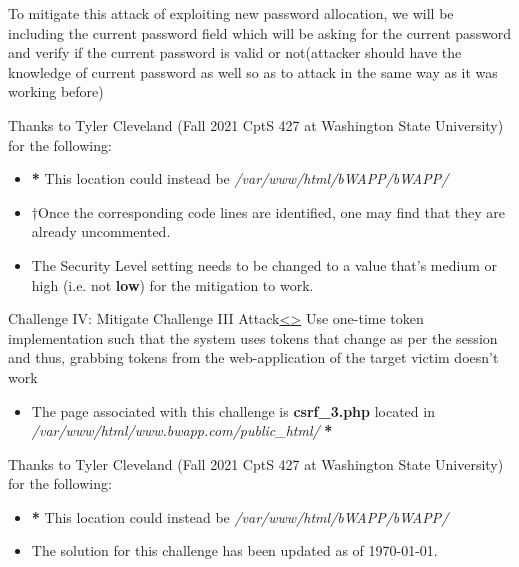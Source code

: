 \documentclass[12pt]{extarticle}
\newenvironment{instructionblock}{\Large\bgroup}{\egroup}
\begin{document}
\vspace{4mm}
\noindent
To mitigate this attack of exploiting new password allocation, we will be including the current password field which will be asking for the current password and verify if the current password is valid or not(attacker should have the knowledge of current password as well so as to attack in the same way as it was working before)

\vspace{8mm}
\noindent
{Thanks to Tyler Cleveland (Fall 2021 CptS 427 at Washington State University) for the following:}
\begin{itemize}
	\item {\textbf{*} This location could instead be \textit{/var/www/html/bWAPP/bWAPP/}}
	\item {\textbf{$\dagger$}Once the corresponding code lines are identified, one may find that they are already uncommented. }
	\item {The Security Level setting needs to be changed to a value that's medium or high (i.e. not \textbf{low}) for the mitigation to work. }
\end{itemize}






\pagebreak
\begin{slide}{Challenge IV: Mitigate Challenge III Attack}{\hyperref[slide 19]{\textless}\hyperref[slide 21]{\textgreater}}
	\begin{instructionblock}
		Use one-time token implementation such that the system uses tokens that change as per the session and thus, grabbing tokens from the web-application of the target victim doesn't work
		\begin{itemize}
			\item The page associated with this challenge is \textbf{csrf\_3.php} located in \textit{/var/www/html/www.bwapp.com/public\_html/}
			\textbf{*} 
		\end{itemize}
	\end{instructionblock}	
\end{slide}

\vspace{8mm}
\noindent
{Thanks to Tyler Cleveland (Fall 2021 CptS 427 at Washington State University) for the following:}
\begin{itemize}
	\item {\textbf{*} This location could instead be \textit{/var/www/html/bWAPP/bWAPP/}}
	\item {The solution for this challenge has been updated as of \today.}
\end{itemize}
\end{document}
